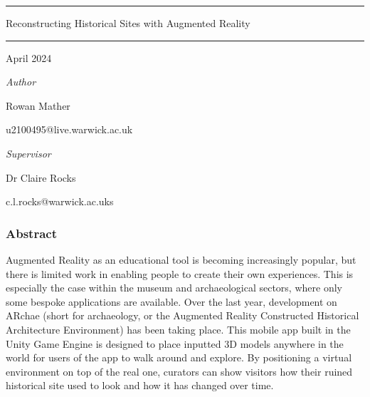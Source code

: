 \documentclass[12pt, a4paper]{article}
\begin{document}

\begin{titlepage}
\centering
    {\centering
    \vspace*{3cm}

    \hrule
    \vspace*{1cm}  
    {\huge Reconstructing Historical Sites with Augmented Reality}
    \vspace*{1 cm}  
    \hrule
    
    \vspace*{3cm}  
    
    {
    \Large
    April 2024
    }

    \vspace*{10cm} 
    }

    \begin{minipage}{.48\textwidth}
        \large
        \raggedright
        \textit{Author} \par 
        Rowan Mather \par u2100495@live.warwick.ac.uk
    \end{minipage}
    \begin{minipage}{.02\textwidth}
    \hspace{1pt}
    \end{minipage}
    \begin{minipage}{.48\textwidth}
        \raggedleft
        \large
        \textit{Supervisor} \par 
        Dr Claire Rocks \par c.l.rocks@warwick.ac.uks
    \end{minipage} 
            
\end{titlepage}

\newpage

\vspace*{1cm}

\begin{center}
\subsubsection*{Abstract}
\end{center}
Augmented Reality as an educational tool is becoming increasingly popular, but there is limited work in enabling people to create their own experiences. This is especially the case within the museum and archaeological sectors, where only some bespoke applications are available. Over the last year, development on ARchae (short for archaeology, or the Augmented Reality Constructed Historical Architecture Environment) has been taking place. This mobile app built in the Unity Game Engine is designed to place inputted 3D models anywhere in the world for users of the app to walk around and explore. By positioning a virtual environment on top of the real one, curators can show visitors how their ruined historical site used to look and how it has changed over time.
\end{document}
